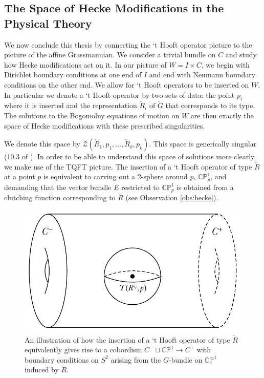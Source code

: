 	\subsection{The Space of Hecke Modifications in the Physical Theory}
	
	We now conclude this thesis by connecting the `t Hooft operator picture to the picture of the affine Grassmannian. We consider a trivial bundle on $C$ and study how Hecke modifications act on it. In our picture of $W = I \times C$, we begin with Dirichlet boundary conditions at one end of $I$ and end with Neumann boundary conditions on the other end. We allow for `t Hooft operators to be inserted on $W$. In particular we denote a `t Hooft operator by two sets of data: the point $p_i$ where it is inserted and the representation $\check R_i$ of $\check G$ that corresponds to its type. The solutions to the Bogomolny equations of motion on $W$ are then exactly the space of Hecke modifications with these prescribed singularities.
	
	We denote this space by $\mathcal Z(\check R_1, p_1, \dots, \check R_k, p_k)$. This space is generically singular (10.3 of \cite{kapustin2006}). In order to be able to understand this space of solutions more clearly, we make use of the TQFT picture. The insertion of a `t Hooft operator of type $\check R$ at a point $p$ is equivalent to carving out a 2-sphere around $p$, $\mathbb{CP}^1_p$, and demanding that the vector bundle $E$ restricted to $\mathbb{CP}^1_p$ is obtained from a clutching function corresponding to $\check R$ (see Observation \ref{obs:hecke}).
	
	\begin{figure}[h]
		\centering
		\includegraphics[scale=0.8]{Figures/Hooft2}
		\caption{An illustration of how the insertion of a `t Hooft operator of type $\check R$ equivalently gives rise to a cobordism $C^- \sqcup \mathbb{CP}^1 \to C^+$ with boundary conditions on $S^2$ arising from the $G$-bundle on $\mathbb{CP}^1$ induced by $\check R$.}
		\label{fig:hooft2}
	\end{figure}
	
